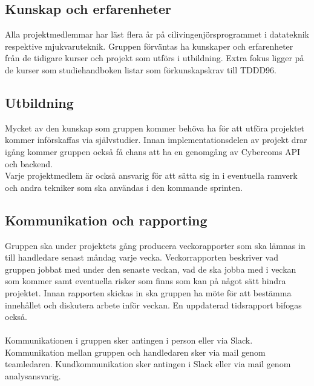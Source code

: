 \subsection{Kunskap och erfarenheter}
Alla projektmedlemmar har läst flera år på cilivingenjörsprogrammet i datateknik respektive mjukvaruteknik. Gruppen förväntas ha kunskaper och erfarenheter från de tidigare kurser och projekt som utförs i utbildning. Extra fokus ligger på de kurser som studiehandboken listar som förkunskapskrav till TDDD96\cite{bib-tddd96}.


\subsection{Utbildning}
Mycket av den kunskap som gruppen kommer behöva ha för att utföra projektet kommer införskaffas via självstudier. Innan implementationsdelen av projekt drar igång kommer gruppen också få chans att ha en genomgång av Cybercoms API och backend.
\\
Varje projektmedlem är också ansvarig för att sätta sig in i eventuella ramverk och andra tekniker som ska användas i den kommande sprinten.

\subsection{Kommunikation och rapporting}
Gruppen ska under projektets gång producera veckorapporter som ska lämnas in till handledare senast måndag varje vecka. Veckorrapporten beskriver vad gruppen jobbat med under den senaste veckan, vad de ska jobba med i veckan som kommer samt eventuella risker som finns som kan på något sätt hindra projektet. Innan rapporten skickas in ska gruppen ha möte för att bestämma innehållet och diskutera arbete inför veckan. En uppdaterad tidsrapport bifogas också.\\
\\
Kommunikationen i gruppen sker antingen i person eller via Slack. Kommunikation mellan gruppen och handledaren sker via mail genom teamledaren. Kundkommunikation sker antingen i Slack eller via mail genom analysansvarig.

\pagebreak
